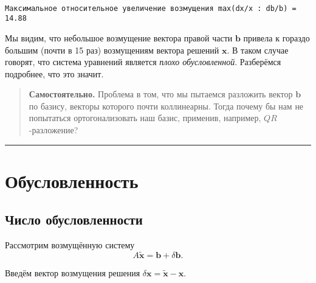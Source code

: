 \documentclass[11pt,a4paper]{article}
\renewcommand{\linethickness}{0.1ex}
\begin{document}
    \begin{center}
    \end{center}
    { \hspace*{\fill} \\}
    

    \begin{Verbatim}[commandchars=\\\{\}]
Максимальное относительное увеличение возмущения max(dx/x : db/b) =  14.88
    \end{Verbatim}

    Мы видим, что небольшое возмущение вектора правой части \(\mathbf{b}\)
привела к гораздо большим (почти в 15 раз) возмущениям вектора решений
\(\mathbf{x}\). В таком случае говорят, что система уравнений является
\emph{плохо обусловленной}. Разберёмся подробнее, что это значит.

    \begin{quote}
\textbf{Самостоятельно.} Проблема в том, что мы пытаемся разложить
вектор \(\mathbf{b}\) по базису, векторы которого почти коллинеарны.
Тогда почему бы нам не попытаться ортогонализовать наш базис, применив,
например, \(QR\)-разложение?
\end{quote}

    \begin{center}\rule{0.5\linewidth}{\linethickness}\end{center}

    \hypertarget{ux43eux431ux443ux441ux43bux43eux432ux43bux435ux43dux43dux43eux441ux442ux44c}{%
\section{Обусловленность}\label{ux43eux431ux443ux441ux43bux43eux432ux43bux435ux43dux43dux43eux441ux442ux44c}}

    \hypertarget{ux447ux438ux441ux43bux43e-ux43eux431ux443ux441ux43bux43eux432ux43bux435ux43dux43dux43eux441ux442ux438}{%
\subsection{Число
обусловленности}\label{ux447ux438ux441ux43bux43e-ux43eux431ux443ux441ux43bux43eux432ux43bux435ux43dux43dux43eux441ux442ux438}}

Рассмотрим возмущённую систему
\[ A \tilde{\mathbf{x}} = \mathbf{b} + \delta\mathbf{b}. \]

Введём вектор возмущения решения
\(\delta \mathbf{x} = \tilde{\mathbf{x}} - \mathbf{x}\).
\end{document}
